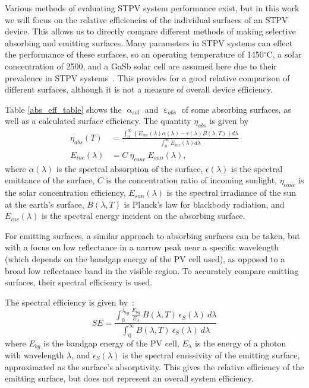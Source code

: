 \documentclass[10pt,letterpaper]{article}
\begin{document}
Various methods of evaluating STPV system performance exist, but in this work we will focus on the relative efficiencies of the individual surfaces of an STPV device.  This allows us to directly compare different methods of making selective absorbing and emitting surfaces.  Many parameters in STPV systems can effect the performance of these surfaces, so an operating temperature of 1450$^\circ$C, a solar concentration of 2500, and a GaSb solar cell are assumed here due to their prevalence in STPV systems~\cite{exp_tokyo,exp_madrid,exp_russia,me1,me2,RF_OptExp_2009}.  This provides for a good relative comparison of different surfaces, although it is not a measure of overall device efficiency.

Table \ref{abs_eff_table} shows the $\upalpha_{sol}$ and $\upepsilon_{abs}$ of some absorbing surfaces, as well as a calculated surface efficiency.  The quantity $\eta_{abs}$ is given by
\begin{align}
\label{overall_sss_eq}\eta_{abs}(T)& = \frac{\int_{0}^{\infty}\left\{E_{inc}(\lambda)\alpha(\lambda)-\epsilon(\lambda)B(\lambda,T)\right\}d\lambda}{\int_{0}^{\infty}E_{inc}(\lambda)d\lambda}\\
\label{e_incident}E_{inc}(\lambda) &= C \: \eta_{conc} \: E_{sun}(\lambda),
\end{align}
where $\alpha(\lambda)$ is the spectral absorption of the surface, $\epsilon(\lambda)$ is the spectral emittance of the surface, $C$ is the concentration ratio of incoming sunlight, 
$\eta_{conc}$ is the solar concentration efficiency, $E_{sun}(\lambda)$ is the 
spectral irradiance of the sun at the earth's surface, $B(\lambda, T)$ is 
Planck's law for blackbody radiation, and $E_{inc}(\lambda)$ is the spectral 
energy incident on the absorbing surface.

For emitting surfaces, a similar approach to absorbing surfaces can be taken, but with a focus on low reflectance in a narrow peak near a specific wavelength (which depends on the bandgap energy of the PV cell used), as opposed to a broad low reflectance band in the visible region.  To accurately compare emitting surfaces, their spectral efficiency is used.

The spectral efficiency is given by~\cite{me2}:
\begin{equation}\label{SpecEff}
SE = \frac{  \int_0^{\lambda_{bg}} \frac{ E_{bg} }{E_{\lambda}} \: B(\lambda, T) \: \epsilon_S (\lambda) \: d\lambda }
{\int_0^{\infty} B(\lambda,T) \: \epsilon_S (\lambda) \: d\lambda}
\end{equation}
where $E_{bg}$ is the bandgap energy of the PV cell, $E_{\lambda}$ is the energy of a photon with wavelength $\lambda$, and $\epsilon_S (\lambda)$ is the spectral emissivity of the emitting surface, approximated as the surface's absorptivity.  This gives the relative efficiency of the emitting surface, but does not represent an overall system efficiency.
\end{document}
